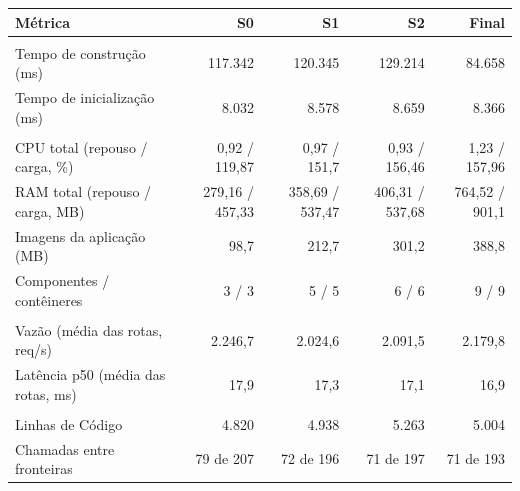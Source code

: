 \begin{quadro}[htb]
  \centering
  \caption{E-commerce --- métricas por snapshot --- Transações.}
  \label{qua:comp_ecommerce_transacoes_snapshots}
  \renewcommand{\arraystretch}{1.15}
  \begin{tabularx}{\textwidth}{|>{\raggedright\arraybackslash}X|r|r|r|r|}
    \hline
    \textbf{Métrica} & \textbf{S0} & \textbf{S1} & \textbf{S2} & \textbf{Final} \\
    \hline
    \multicolumn{5}{|l|}{\textbf{Agilidade}} \\
    \hline
    Tempo de construção (ms) & 117.342 & 120.345 & 129.214 & 84.658 \\
    Tempo de inicialização (ms) & 8.032 & 8.578 & 8.659 & 8.366 \\
    \hline
    \multicolumn{5}{|l|}{\textbf{Custo}} \\
    \hline
    CPU total (repouso / carga, \%) & 0,92 / 119,87 & 0,97 / 151,7 & 0,93 / 156,46 & 1,23 / 157,96 \\
    RAM total (repouso / carga, MB) & 279,16 / 457,33 & 358,69 / 537,47 & 406,31 / 537,68 & 764,52 / 901,1 \\
    Imagens da aplicação (MB) & 98,7 & 212,7 & 301,2 & 388,8 \\
    Componentes / contêineres & 3 / 3 & 5 / 5 & 6 / 6 & 9 / 9 \\
    \hline
    \multicolumn{5}{|l|}{\textbf{Desempenho}} \\
    \hline
    Vazão (média das rotas, req/s) & 2.246,7 & 2.024,6 & 2.091,5 & 2.179,8 \\
    Latência p50 (média das rotas, ms) & 17,9 & 17,3 & 17,1 & 16,9 \\
    \hline
    \multicolumn{5}{|l|}{\textbf{Manutenibilidade}} \\
    \hline
    Linhas de Código & 4.820 & 4.938 & 5.263 & 5.004 \\
    Chamadas entre fronteiras & 79 de 207 & 72 de 196 & 71 de 197 & 71 de 193 \\
    \hline
  \end{tabularx}
\end{quadro}
